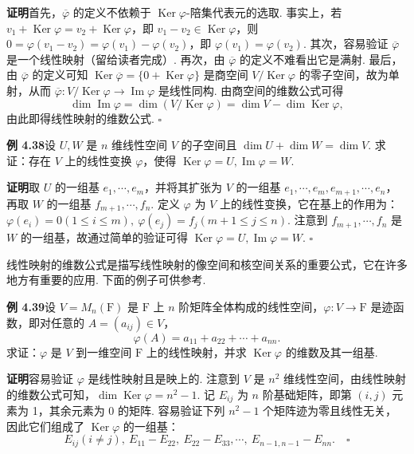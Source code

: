 \documentclass[UTF8, 12pt, fontset=fandol, oneside]{ctexart}
\begin{document}
\noindent\textbf{证明}\quad 首先，$\overline{\varphi}$ 的定义不依赖于 $\operatorname{Ker}\varphi$-陪集代表元的选取. 事实上，若 $v_1+\operatorname{Ker}\varphi=v_2+\operatorname{Ker}\varphi$，即 $v_1-v_2\in\operatorname{Ker}\varphi$，则 $0=\varphi(v_1-v_2)=\varphi(v_1)-\varphi(v_2)$，即 $\varphi(v_1)=\varphi(v_2)$. 其次，容易验证 $\overline{\varphi}$ 是一个线性映射（留给读者完成）. 再次，由 $\overline{\varphi}$ 的定义不难看出它是满射. 最后，由 $\overline{\varphi}$ 的定义可知 $\operatorname{Ker}\overline{\varphi}=\{0+\operatorname{Ker}\varphi\}$ 是商空间 $V/\operatorname{Ker}\varphi$ 的零子空间，故为单射，从而 $\overline{\varphi}:V/\operatorname{Ker}\varphi\to\operatorname{Im}\varphi$ 是线性同构. 由商空间的维数公式可得
\[
\dim\operatorname{Im}\varphi=\dim(V/\operatorname{Ker}\varphi)=\dim V-\dim\operatorname{Ker}\varphi,
\]
由此即得线性映射的维数公式. $\square$

\noindent\textbf{例 4.38}\quad 设 $U,W$ 是 $n$ 维线性空间 $V$ 的子空间且 $\dim U+\dim W=\dim V$. 求证：存在 $V$ 上的线性变换 $\varphi$，使得 $\operatorname{Ker}\varphi=U,\operatorname{Im}\varphi=W$.

\noindent\textbf{证明}\quad 取 $U$ 的一组基 $e_1,\cdots,e_m$，并将其扩张为 $V$ 的一组基 $e_1,\cdots,e_m,e_{m+1},\cdots,e_n$，再取 $W$ 的一组基 $f_{m+1},\cdots,f_n$. 定义 $\varphi$ 为 $V$ 上的线性变换，它在基上的作用为：$\varphi(e_i)=0(1\le i\le m),\ \varphi(e_j)=f_j(m+1\le j\le n)$. 注意到 $f_{m+1},\cdots,f_n$ 是 $W$ 的一组基，故通过简单的验证可得 $\operatorname{Ker}\varphi=U,\operatorname{Im}\varphi=W$. $\square$

线性映射的维数公式是描写线性映射的像空间和核空间关系的重要公式，它在许多地方有重要的应用. 下面的例子可供参考.

\noindent\textbf{例 4.39}\quad 设 $V=M_n(\mathrm{F})$ 是 $\mathrm{F}$ 上 $n$ 阶矩阵全体构成的线性空间，$\varphi:V\to\mathrm{F}$ 是迹函数，即对任意的 $A=(a_{ij})\in V$，
\[
\varphi(A)=a_{11}+a_{22}+\cdots+a_{nn}.
\]
求证：$\varphi$ 是 $V$ 到一维空间 $\mathrm{F}$ 上的线性映射，并求 $\operatorname{Ker}\varphi$ 的维数及其一组基.

\noindent\textbf{证明}\quad 容易验证 $\varphi$ 是线性映射且是映上的. 注意到 $V$ 是 $n^2$ 维线性空间，由线性映射的维数公式可知，$\dim\operatorname{Ker}\varphi=n^2-1$. 记 $E_{ij}$ 为 $n$ 阶基础矩阵，即第 $(i,j)$ 元素为 1，其余元素为 0 的矩阵. 容易验证下列 $n^2-1$ 个矩阵迹为零且线性无关，因此它们组成了 $\operatorname{Ker}\varphi$ 的一组基：
\[
E_{ij}(i\ne j),\ E_{11}-E_{22},\ E_{22}-E_{33},\cdots,\ E_{n-1,n-1}-E_{nn}. \quad \square
\]
\end{document}
